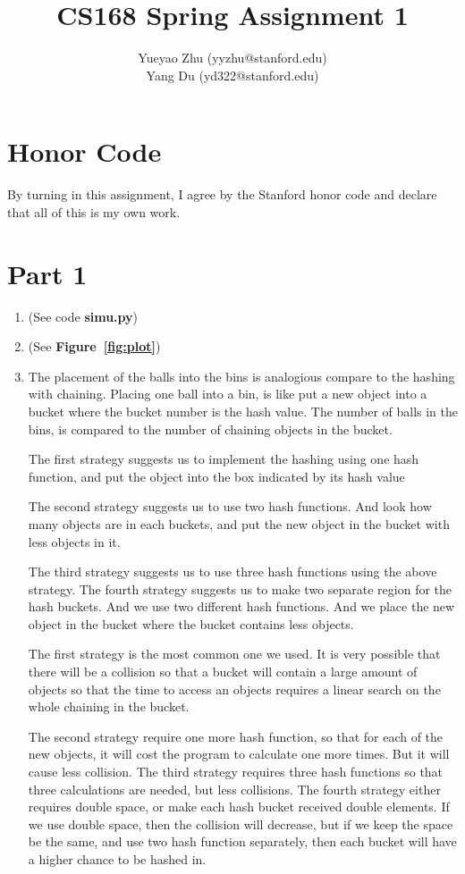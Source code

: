 \documentclass[12pt]{article}
\title{CS168 Spring Assignment 1}
\author{
	Yueyao Zhu	(yyzhu@stanford.edu) \\
	Yang Du (yd322@stanford.edu)
}
\begin{document}
\maketitle

\section*{Honor Code}

By turning in this assignment, I agree by the Stanford honor code and declare
that all of this is my own work.

\section*{Part 1}

\begin{enumerate}[label=(\alph*)]
 	\item (See code \textbf{simu.py})
 	\item (See \textbf{Figure~\ref{fig:plot}})
	\item 

The placement of the balls into the bins is analogious compare to the hashing with chaining. Placing one ball into a bin, is like put a new object into a bucket where the bucket number is the hash value. The number of balls in the bins, is compared to the number of chaining objects in the bucket. 

The first strategy suggests us to implement the hashing using one hash function, and put the object into the box indicated by its hash value

The second strategy suggests us to use two hash functions. And look how many objects are in each buckets, and put the new object in the bucket with less objects in it.

The third strategy suggests us to use three hash functions using the above strategy.
The fourth strategy suggests us to make two separate region for the hash buckets. And we use two different hash functions. And we place the new object in the bucket where the bucket contains less objects.

The first strategy is the most common one we used. It is very possible that there will be a collision so that a bucket will contain a large amount of objects so that the time to access an objects requires a linear search on the whole chaining in the bucket.

The second strategy require one more hash function, so that for each of the new objects, it will cost the program to calculate one more times. But it will cause less collision.
The third strategy requires three hash functions so that three calculations are needed, but less collisions.
The fourth strategy either requires double space, or make each hash bucket received double elements. If we use double space, then the collision will decrease, but if we keep the space be the same, and use two hash function separately, then each bucket will have a higher chance to be hashed in.
\end{enumerate}
\end{document}
